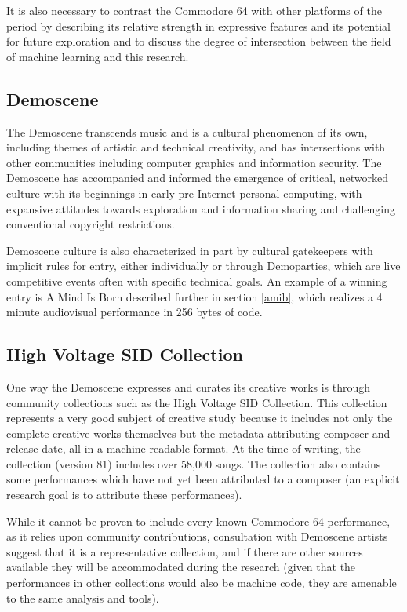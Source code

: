\documentclass[10pt]{article}
\begin{document}
\begin{multicols*}{2}
It is also necessary to contrast the Commodore 64 with other platforms of the period by describing its relative strength in expressive features and its potential for future exploration and to discuss the degree of intersection between the field of machine learning and this research.

\subsection{Demoscene}

The Demoscene transcends music and is a cultural phenomenon of its own\cite{hackingpractices}, including themes of artistic and technical creativity, and has intersections with other communities including computer graphics\cite{siggraphdemo} and information security\cite{layerone}. The Demoscene has accompanied and informed the emergence of critical, networked culture with its beginnings in early pre-Internet personal computing\cite{pioneers}, with expansive attitudes towards exploration and information sharing and challenging conventional copyright restrictions.

Demoscene culture is also characterized in part by cultural gatekeepers with implicit rules for entry\cite{gatekeepers}, either individually or through Demoparties\cite{assembly}, which are live competitive events often with specific technical goals. An example of a winning entry is A Mind Is Born described further in section \ref{amib}, which realizes a 4 minute audiovisual performance in 256 bytes of code.

\subsection{High Voltage SID Collection}
\label{hvsc}

One way the Demoscene expresses and curates its creative works is through community collections such as the High Voltage SID Collection\cite{hvsc}. This collection represents a very good subject of creative study because it includes not only the complete creative works themselves but the metadata attributing composer and release date, all in a machine readable format. At the time of writing, the collection (version 81) includes over 58,000 songs. The collection also contains some performances which have not yet been attributed to a composer (an explicit research goal is to attribute these performances).

While it cannot be proven to include every known Commodore 64 performance, as it relies upon community contributions, consultation with Demoscene artists suggest that it is a representative collection, and if there are other sources available they will be accommodated during the research (given that the performances in other collections would also be machine code, they are amenable to the same analysis and tools).


\end{multicols*}
\end{document}
